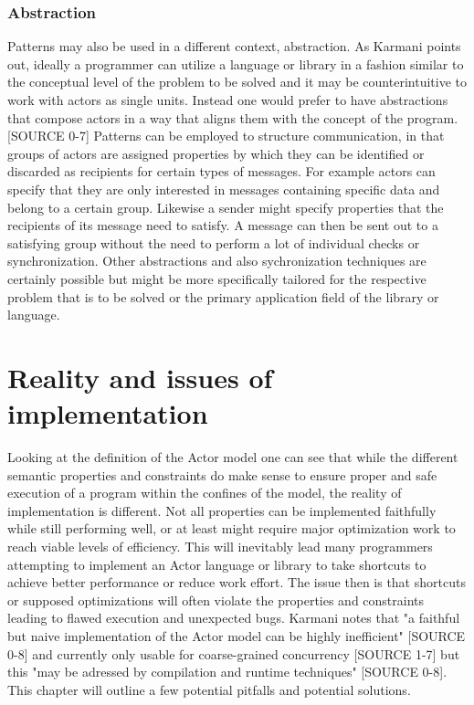 \documentclass[A4]{article}
\begin{document}
\subsubsection{Abstraction}
Patterns may also be used in a different context, abstraction. As Karmani points out, ideally a programmer can utilize a language or library in a fashion similar to the conceptual level of the problem to be solved and it may be counterintuitive to work with actors as single units. Instead one would prefer to have abstractions that compose actors in a way that aligns them with the concept of the program. [SOURCE 0-7]
Patterns can be employed to structure communication, in that groups of actors are assigned properties by which they can be identified or discarded as recipients for certain types of messages. For example actors can specify that they are only interested in messages containing specific data and belong to a certain group. Likewise a sender might specify properties that the recipients of its message need to satisfy. A message can then be sent out to a satisfying group without the need to perform a lot of individual checks or synchronization. 
Other abstractions and also sychronization techniques are certainly possible but might be more specifically tailored for the respective problem that is to be solved or the primary application field of the library or language.

\section{Reality and issues of implementation}
Looking at the definition of the Actor model one can see that while the different semantic properties and constraints do make sense to ensure proper and safe execution of a program within the confines of the model, the reality of implementation is different. Not all properties can be implemented faithfully while still performing well, or at least might require major optimization work to reach viable levels of efficiency. This will inevitably lead many programmers attempting to implement an Actor language or library to take shortcuts to achieve better performance or reduce work effort. The issue then is that shortcuts or supposed optimizations will often violate the properties and constraints leading to flawed execution and unexpected bugs. Karmani notes that "a faithful but naive implementation of the Actor model can be highly inefficient" [SOURCE 0-8] and currently only usable for coarse-grained concurrency [SOURCE 1-7] but this "may be adressed by compilation and runtime techniques" [SOURCE 0-8]. This chapter will outline a few potential pitfalls and potential solutions.
\end{document}
